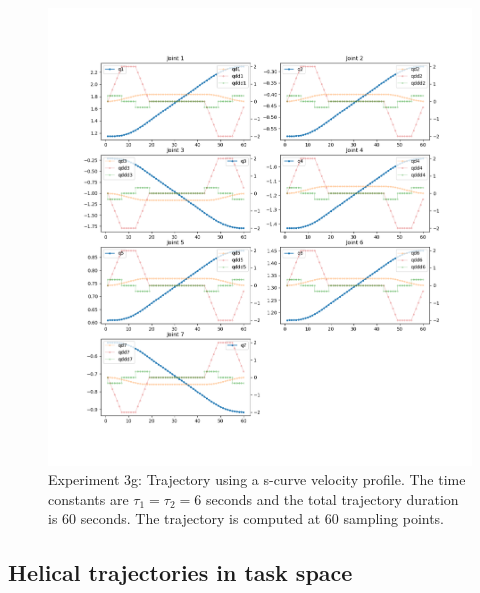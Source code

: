 \begin{center}
\begin{figure}[H]
\centering
\includegraphics[width=\textwidth]{images/robot_planner3/3g_s_curve.png}
\caption{Experiment 3g: Trajectory using a s-curve velocity profile. The time constants are $τ_1 = τ_2 = 6$ seconds and the total trajectory duration is 60 seconds. The trajectory is computed at 60 sampling points.}
\label{robot-planner3g-joint-s-curve}
\end{figure}
\end{center}


\subsection{Helical trajectories in task space}

